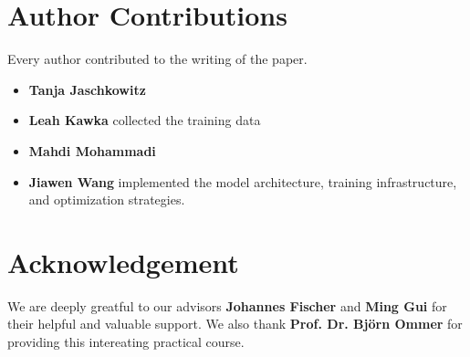 \clearpage
\setcounter{page}{1}
\maketitlesupplementary

\renewcommand{\thesection}{\arabic{section}}

\section{Author Contributions}
\label{sec:author}
Every author contributed to the writing of the paper.
% 
\begin{itemize}
    \item \textbf{Tanja Jaschkowitz}
    \item \textbf{Leah Kawka} collected the training data
    \item \textbf{Mahdi Mohammadi}
    \item \textbf{Jiawen Wang} implemented the model architecture, training infrastructure, and optimization strategies.
\end{itemize}
% 

\section*{Acknowledgement}

We are deeply greatful to our advisors \textbf{Johannes Fischer} and \textbf{Ming Gui} for their helpful and valuable support. 
We also thank \textbf{Prof. Dr. Björn Ommer} for providing this intereating practical course.